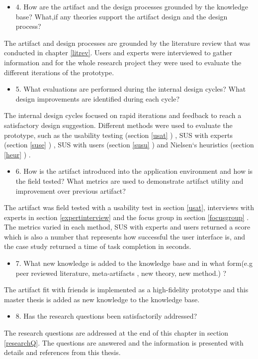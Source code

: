 \begin{itemize}
    \item 4. How are the artifact and the design processes grounded by the knowledge base? What,if any theories support the artifact design and the design process?
\end{itemize}
The artifact and design processes are grounded by the literature review that was conducted in chapter \ref{litrev}. Users and experts were interviewed to gather information and for the whole research project they  were used to evaluate the different iterations of the prototype. 
\begin{itemize}
    \item 5. What evaluations are performed during the internal design cycles? What design improvements are identified during each cycle?
\end{itemize}
The internal design cycles focused on rapid iterations and feedback to reach a satisfactory design suggestion. Different methods were used to evaluate the prototype, such as the usability testing (section \ref{usat} ) , SUS with experts (section \ref{suse} ) , SUS with users (section \ref{susu} ) and Nielsen`s heuristics (section \ref{heur} ) .
\begin{itemize}
    \item 6. How is the artifact introduced into the application environment and how is the field tested? What metrics are used to demonstrate artifact utility and improvement over previous artifact?
\end{itemize}
The artifact was field tested with a usability test in section \ref{usat}, interviews with experts in section \ref{expertinterview} and the focus group in section \ref{focusgroup} . 
The metrics varied in each method, SUS with experts and users returned a score which is also a number that represents how successful the user interface is, and the case study returned a time of task completion in seconds.
\begin{itemize}
    \item 7. What new knowledge is added to the knowledge base and in what form(e.g peer reviewed literature, meta-artifacts , new theory, new method.) ?
\end{itemize}
The artifact fit with friends is implemented as a high-fidelity prototype and this master thesis is added as new knowledge to the knowledge base. 
\begin{itemize}
    \item 8. Has the research questions been satisfactorily addressed?
\end{itemize}
The research questions are addressed at the end of this chapter in section \ref{researchQ}. The questions are answered and the information is presented with details and references from this thesis. 


